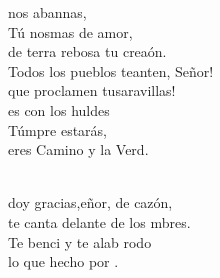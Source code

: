 \documentclass[12pt]{article}
\begin{document}
\begin{multicols*}{2}
\begin{cancion}
	 nos abannas, \\
	Tú nosmas de amor,\\
	de terra rebosa tu creaón.\\
	Todos los pueblos teanten, Señor!\\
	que proclamen tusaravillas!\\
	es con los huldes \\
	Túmpre estarás,\\
	eres  Camino y la Verd.\\\jump\\
	\begin{chorus}%
	 doy gracias,eñor, de cazón,\\
	te canta delante de los mbres. \\
	Te benci y te alab rodo \\
	lo que  hecho por . \\
	\end{chorus}%
	\jump\\
\end{cancion}%


\end{multicols*}
\end{document}
